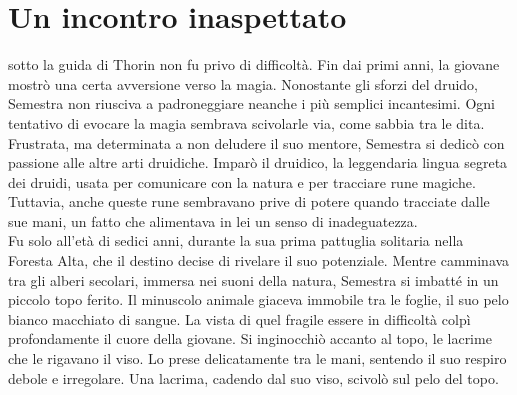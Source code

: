 \documentclass[letterpaper,twocolumn,openany,nodeprecatedcode]{dndbook}
\begin{document}
\section{Un incontro inaspettato}

 sotto la guida di Thorin non fu privo di difficoltà. 
Fin dai primi anni, la giovane mostrò una certa avversione verso la magia. Nonostante gli sforzi 
del druido, Semestra non riusciva a padroneggiare neanche i più semplici incantesimi. 
Ogni tentativo di evocare la magia sembrava scivolarle via, come sabbia tra le dita. 
Frustrata, ma determinata a non deludere il suo mentore, Semestra si dedicò con passione alle 
altre arti druidiche. Imparò il druidico, la leggendaria lingua segreta dei druidi, 
usata per comunicare con la natura e per tracciare rune magiche. 
Tuttavia, anche queste rune sembravano prive di potere quando tracciate dalle sue mani, 
un fatto che alimentava in lei un senso di inadeguatezza.\\

Fu solo all’età di sedici anni, durante la sua prima pattuglia solitaria nella Foresta Alta, 
che il destino decise di rivelare il suo potenziale. Mentre camminava tra gli alberi secolari, 
immersa nei suoni della natura, Semestra si imbatté in un piccolo topo ferito. Il minuscolo 
animale giaceva immobile tra le foglie, il suo pelo bianco macchiato di sangue. 
La vista di quel fragile essere in difficoltà colpì profondamente il cuore della giovane. 
Si inginocchiò accanto al topo, le lacrime che le rigavano il viso. Lo prese delicatamente 
tra le mani, sentendo il suo respiro debole e irregolare. Una lacrima, cadendo dal suo viso, 
scivolò sul pelo del topo.\\
\end{document}

